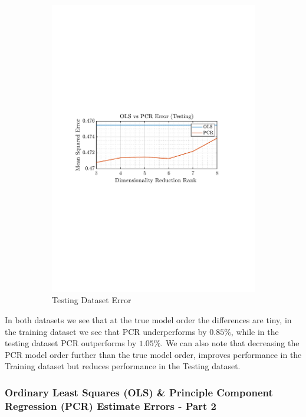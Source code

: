 \documentclass[12pt]{article}
\begin{document}
\begin{figure}[H]
\begin{subfigure}{0.49\textwidth}
 			\includegraphics[trim={2.2cm 11.2cm 3.15cm  11.2cm}, clip, width=\textwidth]{../MATLAB/figures/q1_6c_fig02.pdf} 
 			\captionsetup{justification=centering}
 			\caption{Testing Dataset Error}
 		\end{subfigure}
 		\captionsetup{justification=centering}
 		\caption{}
 		\label{fig: 1-6c}
 	\end{figure}
 
 	In both datasets we see that at the true model order the differences are tiny, in the training dataset we see that PCR underperforms by $0.85\%$, while in the testing dataset PCR outperforms by $1.05\%$. We can also note that decreasing the PCR model order further than the true model order, improves performance in the Training dataset but reduces performance in the Testing dataset.


 	\subsubsection{Ordinary Least Squares (OLS) \& Principle Component Regression (PCR)  Estimate Errors - Part 2}
 	 
\end{document}
